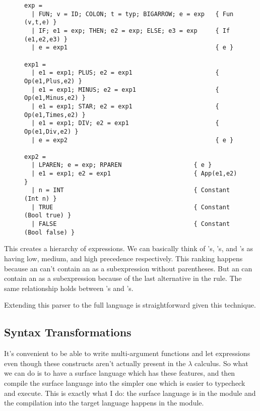 \documentclass[pageno]{jpaper}
\begin{document}
{{{\begin{figure}
\begin{lstlisting}
exp =
  | FUN; v = ID; COLON; t = typ; BIGARROW; e = exp   { Fun (v,t,e) }
  | IF; e1 = exp; THEN; e2 = exp; ELSE; e3 = exp     { If (e1,e2,e3) }
  | e = exp1                                         { e }
 
exp1 = 
  | e1 = exp1; PLUS; e2 = exp1                       { Op(e1,Plus,e2) }
  | e1 = exp1; MINUS; e2 = exp1                      { Op(e1,Minus,e2) }
  | e1 = exp1; STAR; e2 = exp1                       { Op(e1,Times,e2) }
  | e1 = exp1; DIV; e2 = exp1                        { Op(e1,Div,e2) }
  | e = exp2                                         { e }

exp2 =
  | LPAREN; e = exp; RPAREN                    { e }
  | e1 = exp1; e2 = exp1                       { App(e1,e2) }
  | n = INT                                    { Constant (Int n) }
  | TRUE                                       { Constant (Bool true) }
  | FALSE                                      { Constant (Bool false) }

\end{lstlisting}
\end{figure}
\FloatBarrier

This creates a hierarchy of expressions.  We can basically think of 's, 's, and 's as having low, medium, and high precedence respectively.
This ranking happens because an  can't contain an  as a subexpression without
parentheses. But an  can contain an  as a subexpression because of the last
alternative in the  rule.  The same relationship holds between 's and
's.

Extending this parser to the full language is straightforward given this technique.


\subsection{Syntax Transformations}

It's convenient to be able to write multi-argument functions and let expressions
even though these constructs aren't actually present in the $\lambda$ calculus.
So what we can do is to have a surface language which has these features, and then compile
the surface language into the simpler one which is easier to typecheck and execute.
This is exactly what I do: the surface language is in the module
 and the compilation into the target language happens in the  module.

}}}
\end{document}
